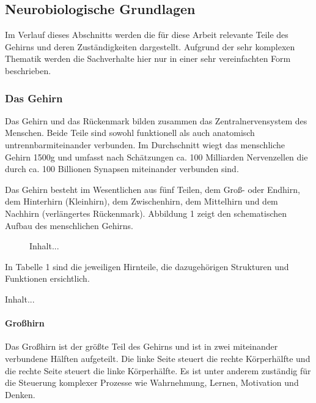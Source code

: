 \subsection{Neurobiologische Grundlagen}
Im Verlauf dieses Abschnitts werden die für diese Arbeit relevante Teile des Gehirns und deren Zuständigkeiten dargestellt. Aufgrund der sehr komplexen Thematik werden die Sachverhalte hier nur in einer sehr vereinfachten Form beschrieben. 

\subsubsection{Das Gehirn}
Das Gehirn und das Rückenmark bilden zusammen das Zentralnervensystem des Menschen. Beide Teile sind \glqq sowohl funktionell als auch anatomisch untrennbar\grqq miteinander verbunden. \citep[S. 105]{Kirschbaum.2008} Im Durchschnitt wiegt das menschliche Gehirn 1500g und umfasst nach Schätzungen  ca. 100 Milliarden Nervenzellen die durch ca. 100 Billionen Synapsen miteinander verbunden sind. \citep{Weber.2011}

Das Gehirn besteht im Wesentlichen aus fünf Teilen, dem Groß- oder Endhirn, dem Hinterhirn (Kleinhirn), dem Zwischenhirn, dem Mittelhirn und dem Nachhirn (verlängertes Rückenmark). \citep{Schaefers.2014} Abbildung 1 zeigt den schematischen Aufbau des menschlichen Gehirns.

\begin{figure}
Inhalt...
\end{figure}

In Tabelle 1 sind die jeweiligen Hirnteile, die dazugehörigen Strukturen und Funktionen ersichtlich.

\begin{table}
Inhalt...
\end{table}

\paragraph*{Großhirn}
Das Großhirn ist der größte Teil des Gehirns und ist in zwei miteinander verbundene Hälften aufgeteilt. Die linke Seite steuert die rechte Körperhälfte und die rechte Seite steuert die linke Körperhälfte. Es ist unter anderem zuständig für die \glqq Steuerung komplexer Prozesse wie Wahrnehmung, Lernen, Motivation und Denken.\grqq \citep[S. 115]{Kirschbaum.2008}

